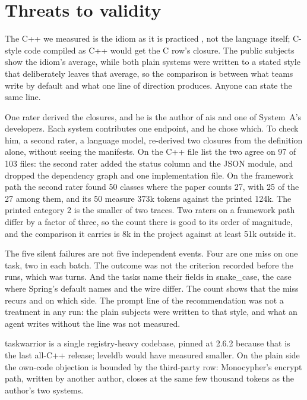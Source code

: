 \documentclass[journal]{IEEEtran}
\begin{document}
\section{Threats to validity}
\label{sec:threats}

The C++ we measured is the idiom as it is practiced \cite{stroustrup},
not the language itself; C-style code compiled as C++ would get the C
row's closure. The public subjects show the idiom's average, while both
plain systems were written to a stated style that deliberately leaves
that average, so the comparison is between what teams write by default
and what one line of direction produces. Anyone can state the same line.

One rater derived the closures, and he is the author of ais and one of
System~A's developers. Each system contributes one endpoint, and he chose
which. To check him, a second rater, a language model, re-derived two closures from the
definition alone, without seeing the manifests. On the C++ file list the
two agree on 97 of 103 files: the second rater added the status column
and the JSON module, and dropped the dependency graph and one
implementation file. On the framework path the second rater found 50
classes where the paper counts 27, with 25 of the 27 among them, and its
50 measure 373k tokens against the printed 124k. The printed category 2
is the smaller of two traces. Two raters on a framework path differ by
a factor of three, so the count there is good to its order of
magnitude, and the comparison it carries is 8k in the project against
at least 51k outside it.

The five silent failures are not five independent events. Four are one
miss on one task, two in each batch. The outcome was not the criterion
recorded before the runs, which was turns. And the tasks name their
fields in snake\_case, the case where Spring's default names and the
wire differ. The count shows that the miss recurs and on which side.
The prompt line of the recommendation was not a treatment in any run:
the plain subjects were written to that style, and what an agent
writes without the line was not measured.

taskwarrior is a single registry-heavy codebase, pinned at
2.6.2 because that is the last all-C++ release; leveldb would have
measured smaller. On the plain side the own-code objection is bounded by
the third-party row: Monocypher's encrypt path, written by another
author, closes at the same few thousand tokens as the author's two
systems.
\end{document}
